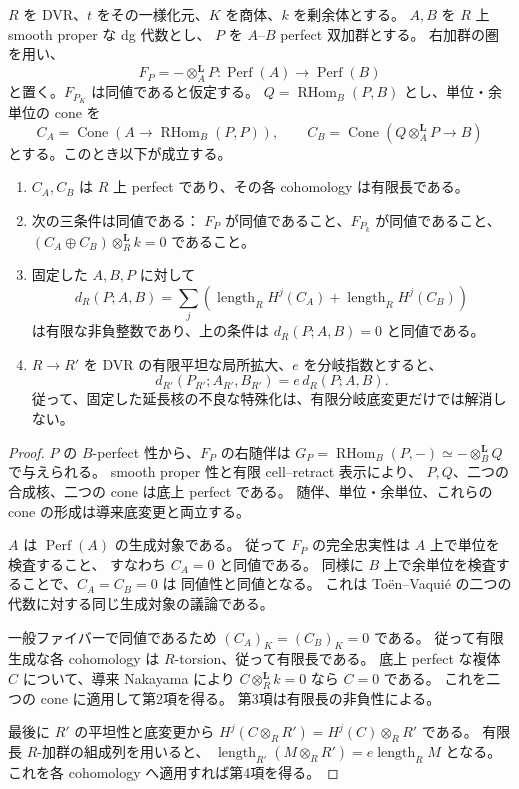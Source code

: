 \begin{proposition}
\label{grl:prop:trait-kernel-test}
$R$ を DVR、$t$ をその一様化元、$K$ を商体、$k$ を剰余体とする。
$A,B$ を $R$ 上 smooth proper な dg 代数とし、
$P$ を $A$--$B$ perfect 双加群とする。
右加群の圏を用い、
\[
 F_P=-\otimes_A^{\mathbf L}P:
 \operatorname{Perf}(A)\longrightarrow\operatorname{Perf}(B)
\]
と置く。$F_{P_K}$ は同値であると仮定する。
$Q=\operatorname{RHom}_B(P,B)$ とし、単位・余単位の cone を
\[
 C_A=\operatorname{Cone}\left(
 A\longrightarrow\operatorname{RHom}_B(P,P)\right),\qquad
 C_B=\operatorname{Cone}\left(
 Q\otimes_A^{\mathbf L}P\longrightarrow B\right)
\]
とする。このとき以下が成立する。
\begin{enumerate}
\item $C_A,C_B$ は $R$ 上 perfect であり、その各 cohomology は有限長である。
\item 次の三条件は同値である：
  $F_P$ が同値であること、$F_{P_k}$ が同値であること、
  $(C_A\oplus C_B)\otimes_R^{\mathbf L}k=0$ であること。
\item 固定した $A,B,P$ に対して
\[
 d_R(P;A,B)=\sum_j\left(
 \operatorname{length}_R H^j(C_A)
 +\operatorname{length}_R H^j(C_B)\right)
\]
は有限な非負整数であり、上の条件は $d_R(P;A,B)=0$ と同値である。
\item $R\to R'$ を DVR の有限平坦な局所拡大、$e$ を分岐指数とすると、
\[
 d_{R'}(P_{R'};A_{R'},B_{R'})=e\,d_R(P;A,B).
\]
従って、固定した延長核の不良な特殊化は、有限分岐底変更だけでは解消しない。
\end{enumerate}
\end{proposition}

\begin{proof}
$P$ の $B$-perfect 性から、$F_P$ の右随伴は
$G_P=\operatorname{RHom}_B(P,-)\simeq-\otimes_B^{\mathbf L}Q$ で与えられる。
smooth proper 性と有限 cell--retract 表示により、
$P,Q$、二つの合成核、二つの cone は底上 perfect である。
随伴、単位・余単位、これらの cone の形成は導来底変更と両立する。

$A$ は $\operatorname{Perf}(A)$ の生成対象である。
従って $F_P$ の完全忠実性は $A$ 上で単位を検査すること、
すなわち $C_A=0$ と同値である。
同様に $B$ 上で余単位を検査することで、$C_A=C_B=0$ は
同値性と同値となる。
これは To\"en--Vaqui\'e
\cite[Lemma~3.25 and its proof]{NFMToenVaquieModuli}
の二つの代数に対する同じ生成対象の議論である。

一般ファイバーで同値であるため $(C_A)_K=(C_B)_K=0$ である。
従って有限生成な各 cohomology は $R$-torsion、従って有限長である。
底上 perfect な複体 $C$ について、導来 Nakayama により
$C\otimes_R^{\mathbf L}k=0$ なら $C=0$ である。
これを二つの cone に適用して第2項を得る。
第3項は有限長の非負性による。

最後に $R'$ の平坦性と底変更から
$H^j(C\otimes_R R')=H^j(C)\otimes_R R'$ である。
有限長 $R$-加群の組成列を用いると、
$\operatorname{length}_{R'}(M\otimes_R R')
=e\operatorname{length}_R M$ となる。
これを各 cohomology へ適用すれば第4項を得る。
\end{proof}

